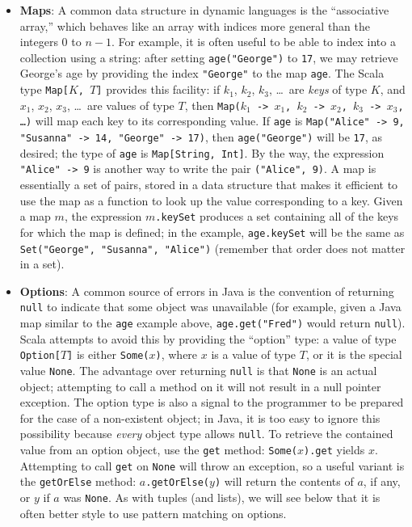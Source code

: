 \documentclass[11pt]{article}
\begin{document}
\begin{itemize}
\item \textbf{Maps}: A common data structure in dynamic languages is the ``associative array,'' which behaves like an array with indices more general than the integers 0 to $n-1$. For example, it is often useful to be able to index into a collection using a string: after setting \texttt{age("George")} to \texttt{17}, we may retrieve George's age by providing the index \texttt{"George"} to the map \texttt{age}. The Scala type \texttt{Map[$K$, $T$]} provides this facility: if $k_1$, $k_2$, $k_3$, \ldots\ are \emph{keys} of type $K$, and $x_1$, $x_2$, $x_3$, \ldots\ are values of type $T$, then \texttt{Map($k_1$ -> $x_1$, $k_2$ -> $x_2$, $k_3$ -> $x_3$, \ldots)} will map each key to its corresponding value. If \texttt{age} is \texttt{Map("Alice" -> 9, "Susanna" -> 14, "George" -> 17)}, then \texttt{age("George")} will be \texttt{17}, as desired; the type of \texttt{age} is \texttt{Map[String, Int]}. By the way, the expression \texttt{"Alice" -> 9} is another way to write the pair \texttt{("Alice", 9)}. A map is essentially a set of pairs, stored in a data structure that makes it efficient to use the map as a function to look up the value corresponding to a key. Given a map $m$, the expression \texttt{$m$.keySet} produces a set containing all of the keys for which the map is defined; in the example, \texttt{age.keySet} will be the same as \texttt{Set("George", "Susanna", "Alice")} (remember that order does not matter in a set).

\item \textbf{Options}: A common source of errors in Java is the convention of returning \texttt{null} to indicate that some object was unavailable (for example, given a Java map similar to the \texttt{age} example above, \texttt{age.get("Fred")} would return \texttt{null}). Scala attempts to avoid this by providing the ``option'' type: a value of type \texttt{Option[$T$]} is either \texttt{Some($x$)}, where $x$ is a value of type $T$, or it is the special value \texttt{None}. The advantage over returning \texttt{null} is that \texttt{None} is an actual object; attempting to call a method on it will not result in a null pointer exception. The option type is also a signal to the programmer to be prepared for the case of a non-existent object; in Java, it is too easy to ignore this possibility because \emph{every} object type allows \texttt{null}. To retrieve the contained value from an option object, use the \texttt{get} method: \texttt{Some($x$).get} yields $x$. Attempting to call \texttt{get} on \texttt{None} will throw an exception, so a useful variant is the \texttt{getOrElse} method: \texttt{$a$.getOrElse($y$)} will return the contents of $a$, if any, or $y$ if $a$ was \texttt{None}. As with tuples (and lists), we will see below that it is often better style to use pattern matching on options.
\end{itemize}
\end{document}
